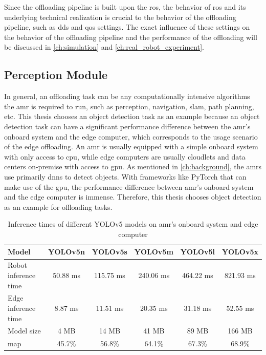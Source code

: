 Since the offloading pipeline is built upon the \gls{ros}, the behavior of \gls{ros} and its underlying technical realization is crucial to the behavior of the offloading pipeline, such as \gls{dds} and \gls{qos} settings. The exact influence of these settings on the behavior of the offloading pipeline and the performance of the offloading will be discussed in \cref{ch:simulation} and \cref{ch:real_robot_experiment}. 

\subsection{Perception Module}



In general, an offloading task can be any computationally intensive algorithms the \gls{amr} is required to run, such as perception, navigation, \gls{slam}, path planning, etc. This thesis chooses an object detection task as an example because an object detection task can have a significant performance difference between the \gls{amr}'s onboard system and the edge computer, which corresponds to the usage scenario of the edge offloading. An \gls{amr} is usually equipped with a simple onboard system with only access to \gls{cpu}, while edge computers are usually cloudlets and data centers on-premise with access to \gls{gpu}. As mentioned in \cref{ch:background}, the \glspl{amr} use primarily \glspl{dnn} to detect objects. With frameworks like PyTorch that can make use of the \gls{gpu}, the performance difference between \gls{amr}'s onboard system and the edge computer is immense. Therefore, this thesis chooses object detection as an example for offloading tasks. 

\begin{table}[htb]%
    \centering%
    \begin{tabular}{lccccc}
        \toprule
        Model &                     YOLOv5n &   YOLOv5s &   YOLOv5m &   YOLOv5l &   YOLOv5x \\
        \midrule
        Robot inference time &      50.88 ms &  115.75 ms & 240.06 ms & 464.22 ms & 821.93 ms  \\
        Edge inference time &       8.87 ms &   11.51 ms &  20.35 ms &  31.18 ms &  52.55 ms  \\
        Model size &                4 MB &      14 MB &     41 MB &     89 MB &     166 MB    \\
        \gls{map} &                 45.7\% &    56.8\% &    64.1\% &    67.3\% &    68.9\%  \\
        \bottomrule
    \end{tabular}
    \caption{Inference times of different YOLOv5 models on \gls{amr}'s onboard system and edge computer}
    \label{tab:inference_time}%
\end{table}

